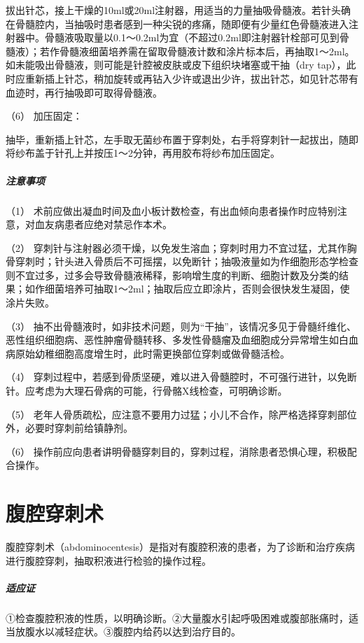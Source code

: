 拔出针芯，接上干燥的10ml或20ml注射器，用适当的力量抽吸骨髓液。若针头确在骨髓腔内，当抽吸时患者感到一种尖锐的疼痛，随即便有少量红色骨髓液进入注射器中。骨髓液吸取量以0.1～0.2ml为宜（不超过0.2ml即注射器针栓部可见到骨髓液）；若作骨髓液细菌培养需在留取骨髓液计数和涂片标本后，再抽取1～2ml。如未能吸出骨髓液，则可能是针腔被皮肤或皮下组织块堵塞或干抽（dry
tap），此时应重新插上针芯，稍加旋转或再钻入少许或退出少许，拔出针芯，如见针芯带有血迹时，再行抽吸即可取得骨髓液。

\hypertarget{text00379.htmlux5cux23CHP16-7-3-3-6}{}
（6） 加压固定：

抽毕，重新插上针芯，左手取无菌纱布置于穿刺处，右手将穿刺针一起拔出，随即将纱布盖于针孔上并按压1～2分钟，再用胶布将纱布加压固定。

\subparagraph{注意事项}

（1）
术前应做出凝血时间及血小板计数检查，有出血倾向患者操作时应特别注意，对血友病患者应绝对禁忌作本术。

（2）
穿刺针与注射器必须干燥，以免发生溶血；穿刺时用力不宜过猛，尤其作胸骨穿刺时；针头进入骨质后不可摇摆，以免断针；抽吸液量如为作细胞形态学检查则不宜过多，过多会导致骨髓液稀释，影响增生度的判断、细胞计数及分类的结果；如作细菌培养可抽取1～2ml；抽取后应立即涂片，否则会很快发生凝固，使涂片失败。

（3）
抽不出骨髓液时，如非技术问题，则为“干抽”，该情况多见于骨髓纤维化、恶性组织细胞病、恶性肿瘤骨髓转移、多发性骨髓瘤及血细胞成分异常增生如白血病原始幼稚细胞高度增生时，此时需更换部位穿刺或做骨髓活检。

（4）
穿刺过程中，若感到骨质坚硬，难以进入骨髓腔时，不可强行进针，以免断针。应考虑为大理石骨病的可能，行骨骼X线检查，可明确诊断。

（5）
老年人骨质疏松，应注意不要用力过猛；小儿不合作，除严格选择穿刺部位外，必要时穿刺前给镇静剂。

（6）
操作前应向患者讲明骨髓穿刺目的，穿刺过程，消除患者恐惧心理，积极配合操作。

\protect\hypertarget{text00380.html}{}{}

\section{腹腔穿刺术}

腹腔穿刺术（abdominocentesis）是指对有腹腔积液的患者，为了诊断和治疗疾病进行腹腔穿刺，抽取积液进行检验的操作过程。

\subparagraph{适应证}

①检查腹腔积液的性质，以明确诊断。②大量腹水引起呼吸困难或腹部胀痛时，适当放腹水以减轻症状。③腹腔内给药以达到治疗目的。

